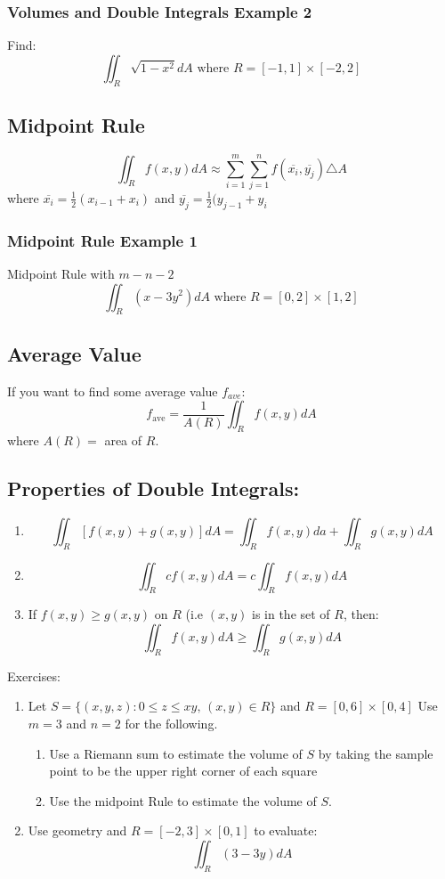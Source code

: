 \documentclass[12pt]{article}
\begin{document}
\subsubsection{Volumes and Double Integrals Example 2}
Find: \[
	\iint_{R}\sqrt{1-x^2} dA \text{ where } R = [-1,1] \times [-2,2]
\]

\subsection{Midpoint Rule}
\[
	\iint_{R}f(x,y)dA \approx \sum_{i=1}^{m} \sum_{j=1}^{n} f(\overline{x_i}, \overline{y_j})\triangle A
\]
where \(\overline{x_i} = \frac{1}{2}(x_{i-1} + x_i)	\) and \(\overline{y_j} = \frac{1}{2}(y_{j-1} + y_i	\)

\subsubsection{Midpoint Rule Example 1	}
Midpoint Rule with \(m-n-2\)
\[
	\iint_{R}(x - 3y^2)dA \text{ where } R = [0,2] \times [1,2]
\]

\subsection{Average Value}
If you want to find some average value \(f_{ave}\):
\[
	f_{\text{ave}} = \frac{1}{A(R)} \iint_{R}f(x,y)dA
\]
where \(A(R) = \) area of \(R\).

\subsection{Properties of Double Integrals:}
\begin{enumerate}
	\item \[
			\iint_{R}[f(x,y) + g(x,y)]dA = \iint_{R}f(x,y)da + \iint_{R}g(x,y)dA
	\]
	\item \[
		\iint_{R}cf(x,y)dA = c \iint_{R}f(x,y)dA
	\]
	\item If \(f(x,y) \geq g(x,y)\) on \(R\) (i.e \((x,y)\) is in the set of \(R\), then: 
	\[
	\iint_{R}f(x,y)dA \geq \iint_{R}g(x,y)dA
\] 
\end{enumerate}

Exercises:
\begin{enumerate}
	\item Let \(S = \{(x,y,z): 0 \leq z \leq xy \text{, }(x,y) \in R\}\) and \(R = [0,6] \times [0,4] \) Use \( m = 3\) and \( n = 2\) for the following.
			\begin{enumerate}
				\item Use a Riemann sum to estimate the volume of \(S\) by taking the sample point to be the upper right corner of each square
				\item Use the midpoint Rule to estimate the volume of \(S\).
			\end{enumerate}
		\item Use geometry and \(R = [-2,3] \times  [0,1]\) to evaluate: 
			\[
				\iint_{R}(3-3y)dA
			\]
\end{enumerate}
\end{document}
